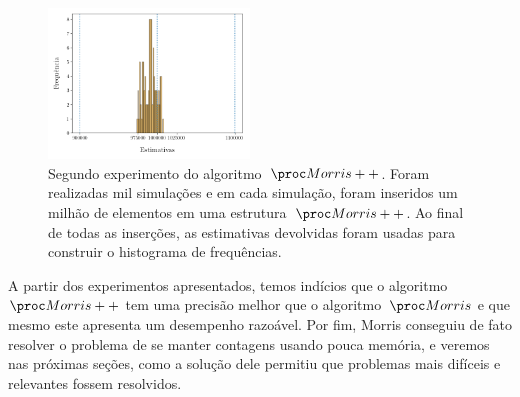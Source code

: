 \begin{figure}[h]
  \centering
  \includegraphics[height=4cm, width=.5\textwidth]{figuras/morris_plus_variance.png}
	\caption{Segundo experimento do algoritmo~$\Morrispp$. Foram realizadas mil simulações e em cada simulação, foram 
  inseridos um milhão de elementos em uma estrutura~$\Morrispp$. Ao final de todas as inserções, as estimativas 
  devolvidas foram usadas para construir o histograma de frequências.}
  \label{fig:morris:plus:variance}
\end{figure}

A partir dos experimentos apresentados, temos indícios que o algoritmo~$\Morrispp$ tem uma precisão melhor que o 
algoritmo~$\Morris$ e que mesmo este apresenta um desempenho razoável. Por fim, Morris conseguiu de fato resolver o 
problema de se manter contagens usando pouca memória, e veremos nas próximas seções, como a solução dele permitiu que
problemas mais difíceis e relevantes fossem resolvidos.
 